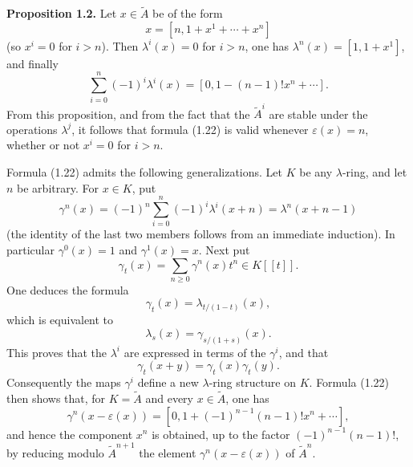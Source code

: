 \documentclass[11pt]{article}
\begin{document}
\textbf{Proposition 1.2.} Let $x\in\widetilde A$ be of the form
\[
x=[n,1+x^1+\cdots+x^n]
\]
(so $x^i=0$ for $i>n$). Then $\lambda^i(x)=0$ for $i>n$, one has $\lambda^n(x)=[1,1+x^1]$, and finally
\begin{equation}\tag{1.22}
\sum_{i=0}^{n}(-1)^i\lambda^i(x)=[0,1-(n-1)!x^n+\cdots].
\end{equation}
From this proposition, and from the fact that the $\widetilde A^i$ are stable under the operations $\lambda^j$, it follows that formula (1.22) is valid whenever $\varepsilon(x)=n$, whether or not $x^i=0$ for $i>n$.

Formula (1.22) admits the following generalizations. Let $K$ be any $\lambda$-ring, and let $n$ be arbitrary. For $x\in K$, put
\begin{equation}\tag{1.23}
\gamma^n(x)=(-1)^n\sum_{i=0}^{n}(-1)^i\lambda^i(x+n)=\lambda^n(x+n-1)
\end{equation}
(the identity of the last two members follows from an immediate induction). In particular $\gamma^0(x)=1$ and $\gamma^1(x)=x$. Next put
\begin{equation}\tag{1.24}
\gamma_t(x)=\sum_{n\geq 0}\gamma^n(x)t^n\in K[[t]].
\end{equation}
One deduces the formula
\begin{equation}\tag{1.25}
\gamma_t(x)=\lambda_{t/(1-t)}(x),
\end{equation}
which is equivalent to
\begin{equation}\tag{1.25 bis}
\lambda_s(x)=\gamma_{s/(1+s)}(x).
\end{equation}
This proves that the $\lambda^i$ are expressed in terms of the $\gamma^i$, and that
\[
\gamma_t(x+y)=\gamma_t(x)\gamma_t(y).
\]
Consequently the maps $\gamma^i$ define a new $\lambda$-ring structure on $K$. Formula (1.22) then shows that, for $K=\widetilde A$ and every $x\in\widetilde A$, one has
\begin{equation}\tag{1.22 bis}
\gamma^n(x-\varepsilon(x))=[0,1+(-1)^{n-1}(n-1)!x^n+\cdots],
\end{equation}
and hence the component $x^n$ is obtained, up to the factor $(-1)^{n-1}(n-1)!$, by reducing modulo $\widetilde A^{n+1}$ the element $\gamma^n(x-\varepsilon(x))$ of $\widetilde A^n$.
\end{document}
